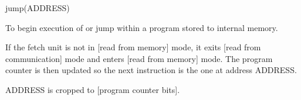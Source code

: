 

\format
jump(ADDRESS)

\purpose

To begin execution of or jump within a program stored to internal memory.

\description

If the fetch unit is not in [read from memory] mode, it exits [read from communication] mode and enters [read from memory] mode.
The program counter is then updated so the next instruction is the one at address ADDRESS.

\notes

ADDRESS is cropped to [program counter bits].
